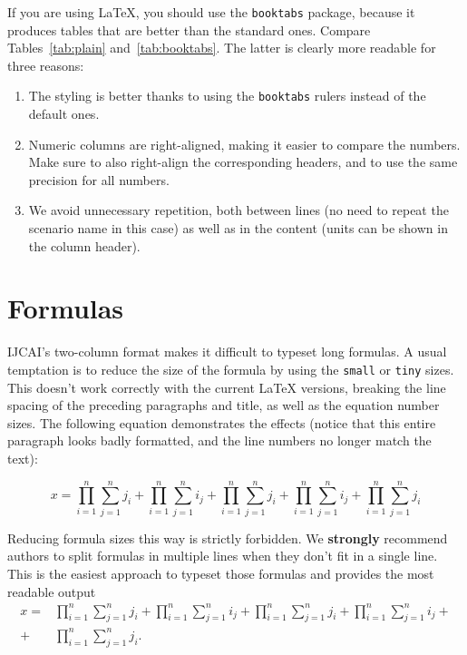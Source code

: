 \documentclass{article}
\begin{document}
If you are using \LaTeX, you should use the {\tt booktabs} package, because it produces tables that are better than the standard ones. Compare Tables~\ref{tab:plain} and~\ref{tab:booktabs}. The latter is clearly more readable for three reasons:

\begin{enumerate}
    \item The styling is better thanks to using the {\tt booktabs} rulers instead of the default ones.
    \item Numeric columns are right-aligned, making it easier to compare the numbers. Make sure to also right-align the corresponding headers, and to use the same precision for all numbers.
    \item We avoid unnecessary repetition, both between lines (no need to repeat the scenario name in this case) as well as in the content (units can be shown in the column header).
\end{enumerate}

\section{Formulas}

IJCAI's two-column format makes it difficult to typeset long formulas. A usual temptation is to reduce the size of the formula by using the {\tt small} or {\tt tiny} sizes. This doesn't work correctly with the current \LaTeX{} versions, breaking the line spacing of the preceding paragraphs and title, as well as the equation number sizes. The following equation demonstrates the effects (notice that this entire paragraph looks badly formatted, and the line numbers no longer match the text):
%
\begin{tiny}
    \begin{equation}
        x = \prod_{i=1}^n \sum_{j=1}^n j_i + \prod_{i=1}^n \sum_{j=1}^n i_j + \prod_{i=1}^n \sum_{j=1}^n j_i + \prod_{i=1}^n \sum_{j=1}^n i_j + \prod_{i=1}^n \sum_{j=1}^n j_i
    \end{equation}
\end{tiny}%

Reducing formula sizes this way is strictly forbidden. We {\bf strongly} recommend authors to split formulas in multiple lines when they don't fit in a single line. This is the easiest approach to typeset those formulas and provides the most readable output%
%
\begin{align}
    x = & \prod_{i=1}^n \sum_{j=1}^n j_i + \prod_{i=1}^n \sum_{j=1}^n i_j + \prod_{i=1}^n \sum_{j=1}^n j_i + \prod_{i=1}^n \sum_{j=1}^n i_j + \nonumber \\
    +   & \prod_{i=1}^n \sum_{j=1}^n j_i.
\end{align}%
\end{document}

